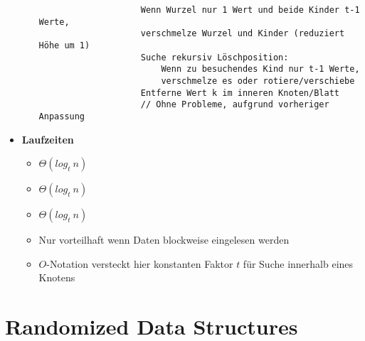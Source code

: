 \begin{itemize}
\begin{itemize}
\begin{verbatim}
                    Wenn Wurzel nur 1 Wert und beide Kinder t-1 Werte, 
                    verschmelze Wurzel und Kinder (reduziert Höhe um 1)
                    Suche rekursiv Löschposition:
                        Wenn zu besuchendes Kind nur t-1 Werte, 
                        verschmelze es oder rotiere/verschiebe
                    Entferne Wert k im inneren Knoten/Blatt             
                    // Ohne Probleme, aufgrund vorheriger Anpassung
                    \end{verbatim}
            \end{itemize}

        \item \textbf{Laufzeiten}
            \begin{itemize}
                \item {} $\Theta(log_t~n)$
                \item {} $\Theta(log_t~n)$
                \item {} $\Theta(log_t~n)$
                \item Nur vorteilhaft wenn Daten blockweise eingelesen werden
                \item $O$-Notation versteckt hier konstanten Faktor $t$ für Suche innerhalb eines Knotens
            \end{itemize}
    \end{itemize}

\section{Randomized Data Structures}

